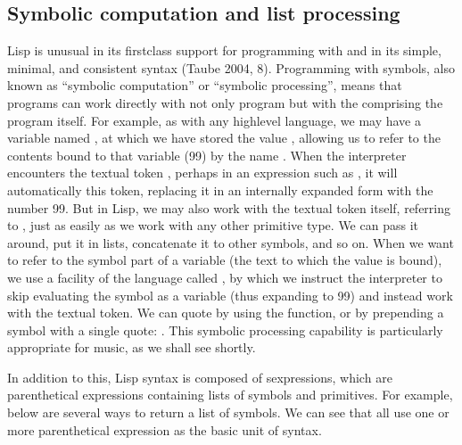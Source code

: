 \documentclass[letterpaper,10pt,english]{sphinxmanual}
\begin{document}
\subsection{Symbolic computation and list processing}
\label{\detokenize{design:symbolic-computation-and-list-processing}}
\sphinxAtStartPar
Lisp is unusual in its first\sphinxhyphen{}class support for programming with  and in its simple, minimal, and consistent syntax (Taube 2004, 8).
Programming with symbols, also known as “symbolic computation” or “symbolic processing”, means
that programs can work directly with not only program  but with the  comprising the program itself.
For example, as with any high\sphinxhyphen{}level language, we may have a variable named , at which we have stored the value ,
allowing us to refer to the contents bound to that variable (99) by the name .
When the interpreter encounters the textual token , perhaps in an expression such as ,
it will automatically  this token, replacing it in an internally expanded form with the number 99.
But in Lisp, we may also work with the textual token itself, referring to ,
just as easily as we work with any other primitive type. We can pass it around, put it in lists,
concatenate it to other symbols, and so on.
When we want to refer to the symbol part of a variable (the text to which the value is bound),
we use a facility of the language called , by which we instruct the interpreter
to skip evaluating the symbol as a variable (thus expanding to 99) and instead work with the textual token.
We can quote by using the  function, or by prepending a symbol with a single quote: .
This symbolic processing capability is particularly appropriate for music, as we shall see shortly.

\sphinxAtStartPar
In addition to this, Lisp syntax is  composed of s\sphinxhyphen{}expressions, which are parenthetical
expressions containing lists of symbols and primitives.
For example, below are several ways to return a list of symbols. We can see that all
use one or more parenthetical expression as the basic unit of syntax.

\begin{sphinxVerbatim}[commandchars=\\\{\}]
\end{sphinxVerbatim}
\end{document}
